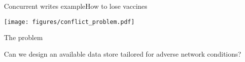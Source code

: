 \begin{frame}{Concurrent writes example}{How to lose vaccines}

\centering

\texttt{[image: figures/conflict\_problem.pdf]}
\end{frame}

\begin{frame}{The problem}



\begin{center}
\Large
Can we design an available data store tailored for adverse network conditions?
\end{center}
	
\end{frame}









